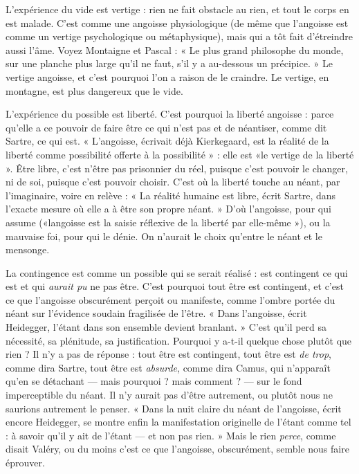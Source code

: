 L'expérience du vide est vertige : rien ne fait obstacle au rien, et tout le
corps en est malade. C’est comme une angoisse physiologique (de même que
l'angoisse est comme un vertige psychologique ou métaphysique), mais qui a
tôt fait d’étreindre aussi l’âme. Voyez Montaigne et Pascal : « Le plus grand
philosophe du monde, sur une planche plus large qu’il ne faut, s’il y a au-dessous
un précipice. » Le vertige angoisse, et c’est pourquoi l’on a raison de le
craindre. Le vertige, en montagne, est plus dangereux que le vide.

L'expérience du possible est liberté. C’est pourquoi la liberté angoisse :
parce qu’elle a ce pouvoir de faire être ce qui n’est pas et de néantiser, comme
dit Sartre, ce qui est. « L’angoisse, écrivait déjà Kierkegaard, est la réalité de la
liberté comme possibilité offerte à la possibilité » : elle est «le vertige de la
liberté ». Être libre, c’est n’être pas prisonnier du réel, puisque c’est pouvoir le
changer, ni de soi, puisque c’est pouvoir choisir. C’est où la liberté touche au
néant, par l'imaginaire, voire en relève : « La réalité humaine est libre, écrit
Sartre, dans l’exacte mesure où elle a à être son propre néant. » D’où l’angoisse,
pour qui assume («langoisse est la saisie réflexive de la liberté par elle-même »),
ou la mauvaise foi, pour qui le dénie. On n’aurait le choix qu’entre le
néant et le mensonge.

La contingence est comme un possible qui se serait réalisé : est contingent
ce qui est et qui {\it aurait pu} ne pas être. C’est pourquoi tout être est contingent,
et c’est ce que l’angoisse obscurément perçoit ou manifeste, comme l’ombre
portée du néant sur l’évidence soudain fragilisée de l’être. « Dans l’angoisse,
écrit Heidegger, l’étant dans son ensemble devient branlant. » C’est qu’il perd
sa nécessité, sa plénitude, sa justification. Pourquoi y a-t-il quelque chose
plutôt que rien ? Il n’y a pas de réponse : tout être est contingent, tout être est
{\it de trop}, comme dira Sartre, tout être est {\it absurde}, comme dira Camus, qui
n'apparaît qu’en se détachant — mais pourquoi ? mais comment ? — sur le fond
imperceptible du néant. Il n’y aurait pas d’être autrement, ou plutôt nous ne
saurions autrement le penser. « Dans la nuit claire du néant de l’angoisse, écrit
encore Heidegger, se montre enfin la manifestation originelle de l’étant comme
tel : à savoir qu’il y ait de l’étant — et non pas rien. » Mais le rien {\it perce}, comme
disait Valéry, ou du moins c’est ce que l'angoisse, obscurément, semble nous
faire éprouver.

